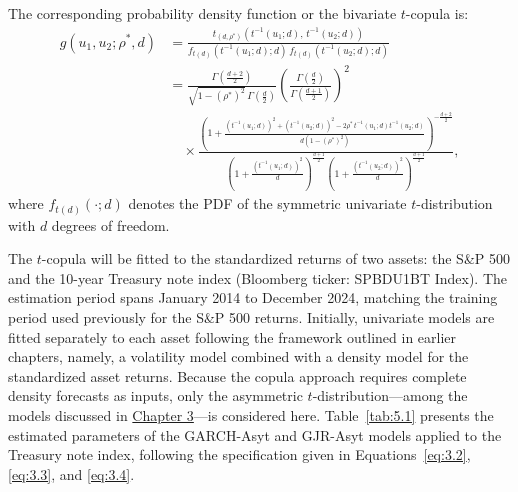 The corresponding probability density function or the bivariate $t$-copula is:
\begin{equation}
\begin{aligned}
g(u_1, u_2; \rho^*, d) &= \frac{
    t_{(d, \rho^*)}(t^{-1}(u_1; d), \, t^{-1}(u_2; d))
}{
    f_{t(d)}(t^{-1}(u_1; d); d) \, f_{t(d)}(t^{-1}(u_2; d); d)
} \\
&= \frac{
    \Gamma\left(\frac{d+2}{2}\right)
}{
    \sqrt{1 - (\rho^*)^2} \, \Gamma\left(\frac{d}{2}\right)
}
\left(
\frac{\Gamma\left(\frac{d}{2}\right)}{\Gamma\left(\frac{d+1}{2}\right)}
\right)^2 \\
&\quad \times
\frac{\left(
1 + \frac{(t^{-1}(u_1; d))^2 + (t^{-1}(u_2; d))^2 - 2\rho^* \, t^{-1}(u_1; d)t^{-1}(u_2; d)}
{d(1 - (\rho^*)^2)}
\right)^{-\frac{d+2}{2}}}
{
\left(
1 + \frac{(t^{-1}(u_1; d))^2}{d}
\right)^{\frac{d+1}{2}}
\left(
1 + \frac{(t^{-1}(u_2; d))^2}{d}
\right)^{\frac{d+1}{2}}},
\end{aligned}
\label{eq:5.3}
\end{equation}
where $f_{t(d)}(\cdot; d)$ denotes the PDF of the symmetric univariate $t$-distribution with $d$ degrees of freedom.

The $t$-copula will be fitted to the standardized returns of two assets: the S\&P 500 and the 10-year Treasury note index (Bloomberg ticker: SPBDU1BT Index). The estimation period spans January 2014 to December 2024, matching the training period used previously for the S\&P 500 returns. Initially, univariate models are fitted separately to each asset following the framework outlined in earlier chapters, namely, a volatility model combined with a density model for the standardized asset returns. Because the copula approach requires complete density forecasts as inputs, only the asymmetric $t$-distribution—among the models discussed in \hyperref[chap:3]{Chapter 3}—is considered here. Table~\ref{tab:5.1} presents the estimated parameters of the GARCH-Asyt and GJR-Asyt models applied to the Treasury note index, following the specification given in Equations~\eqref{eq:3.2}, \eqref{eq:3.3}, and \eqref{eq:3.4}.

